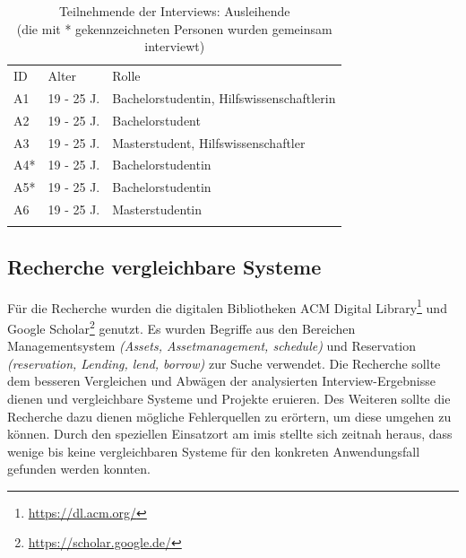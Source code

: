 \begin{table}[h]
        \centering
        \caption[Teilnehmende der Interviews: Ausleihende]{Teilnehmende der
                Interviews: Ausleihende \\
                (die mit * gekennzeichneten Personen wurden gemeinsam
                interviewt)}
        \begin{tabular}{lll}
                \arrayrulecolor{maincolor}\hline
                \sffamily\color{maincolor}ID & \sffamily\color{maincolor}Alter &
                \sffamily\color{maincolor}Rolle
                \\
                \arrayrulecolor{maincolor}\hline
                A1                           & 19 - 25 J.                      &
                Bachelorstudentin, Hilfswissenschaftlerin
                \\
                A2                           & 19 - 25 J.                      &
                Bachelorstudent                                                  \\
                A3                           & 19 - 25 J.                      &
                Masterstudent, Hilfswissenschaftler
                \\
                A4*                          & 19 - 25 J.                      &
                Bachelorstudentin                                                \\
                A5*                          & 19 - 25 J.                      &
                Bachelorstudentin                                                \\
                A6                           & 19 - 25 J.                      &
                Masterstudentin                                                  \\
                \arrayrulecolor{maincolor}\hline
        \end{tabular}
        \label{table:a}
\end{table}

\subsection{Recherche vergleichbare Systeme}
\label{subsection:system}
Für die Recherche wurden die digitalen Bibliotheken ACM Digital
Library\footnote{\url{https://dl.acm.org/}} und Google
Scholar\footnote{\url{https://scholar.google.de/}} genutzt. Es wurden Begriffe
aus den Bereichen Managementsystem \textit{(Assets, Assetmanagement, schedule)}
und Reservation \textit{(reservation, Lending, lend, borrow)} zur Suche
verwendet. Die Recherche sollte dem besseren Vergleichen und Abwägen der
analysierten Interview-Ergebnisse dienen und vergleichbare Systeme und Projekte
eruieren. Des Weiteren sollte die Recherche dazu dienen mögliche Fehlerquellen
zu erörtern, um diese umgehen zu können. Durch den speziellen Einsatzort am
\ac{imis} stellte sich zeitnah heraus, dass wenige bis keine vergleichbaren
Systeme für den konkreten Anwendungsfall gefunden werden konnten.

